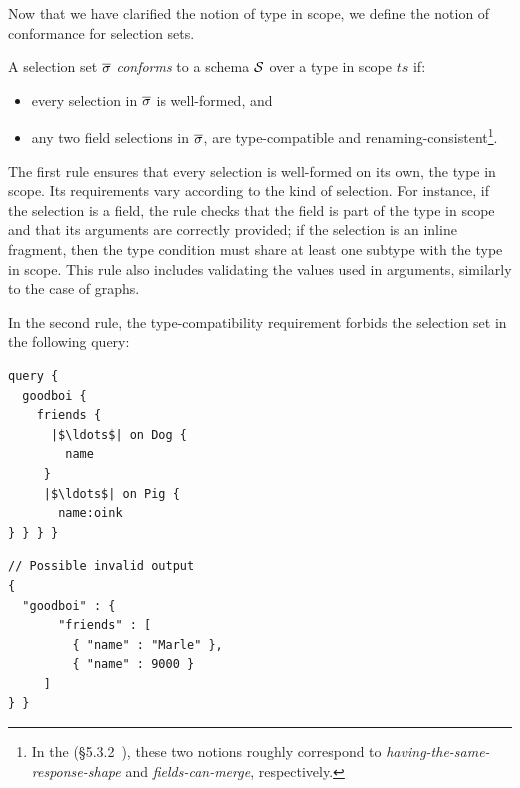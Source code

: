
Now that we have clarified the notion of type in scope, we 
define the notion of conformance for selection sets.

\begin{definition}
A \gql selection set $\overline{\sigma}$ \textit{conforms} to a schema $\mathcal{S}$ over a type in scope $\mathit{ts}$ if:
\begin{itemize}
\item every selection in $\overline{\sigma}$ is  well-formed, and

\item any two field selections in $\overline{\sigma}$,  are type-compatible and
  renaming-consistent\footnote{In the \spec
    (\cf\S5.3.2~\cite{gqlspec}), these two notions roughly correspond
    to \emph{having-the-same-response-shape} and
    \emph{fields-can-merge}, respectively.}.
       
\end{itemize}
\end{definition}

The first rule ensures that every selection is well-formed on its own,
\wrt the type in scope. Its requirements vary according to the
kind of selection. For instance, if the selection is a field, the rule
checks that the field is part of the type in scope and that its
arguments are correctly provided; if the selection is an inline
fragment, then the type condition must share at least one subtype with
the type in scope. This rule also includes validating the values used
in arguments, similarly to the case of graphs.


In the second rule, the type-compatibility requirement forbids the
selection set in \eg the following query:

\begin{minipage}[t]{.22\textwidth}
\begin{verbatim}
query {
  goodboi {
    friends {
      |$\ldots$| on Dog {
        name
     }
     |$\ldots$| on Pig {
       name:oink
} } } }
\end{verbatim}
\end{minipage}%
\begin{minipage}[t]{.22\textwidth}
\begin{verbatim}
// Possible invalid output
{
  "goodboi" : {
       "friends" : [
         { "name" : "Marle" },
         { "name" : 9000 }
     ]
} }
\end{verbatim}
\end{minipage}

